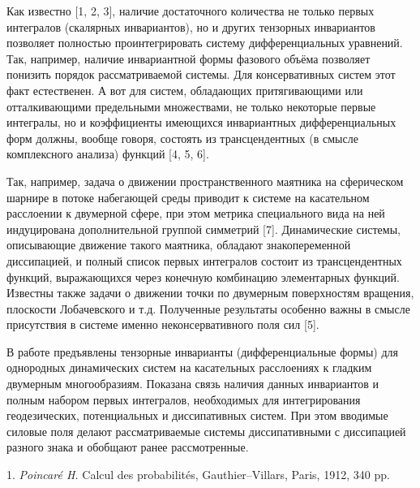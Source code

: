 
\vzmscaption



Как известно [1, 2, 3], наличие достаточного количества не только первых интегралов (скалярных инвариантов), но и других тензорных инвариантов позволяет полностью проинтегрировать систему дифференциальных уравнений. Так, например, наличие инвариантной формы фазового объёма позволяет понизить порядок рассматриваемой системы. Для консервативных систем этот факт естественен. А вот для систем, обладающих притягивающими или отталкивающими предельными множествами, не только некоторые первые интегралы, но и коэффициенты имеющихся инвариантных дифференциальных форм должны, вообще говоря, состоять из трансцендентных (в смысле комплексного анализа) функций [4, 5, 6].

Так, например, задача о движении пространственного маятника на сферическом шарнире в потоке набегающей среды приводит к системе на касательном расслоении к двумерной сфере, при этом метрика специального вида на ней индуцирована дополнительной группой симметрий [7]. Динамические системы, описывающие движение такого маятника, обладают знакопеременной диссипацией, и полный список первых интегралов состоит из трансцендентных функций, выражающихся через конечную комбинацию элементарных функций. Известны также задачи о движении точки по двумерным поверхностям вращения, плоскости Лобачевского и т.д. Полученные результаты особенно важны в смысле присутствия в системе именно неконсервативного поля сил [5].

В работе предъявлены тензорные инварианты (дифференциальные формы) для однородных динамических систем на касательных расслоениях к гладким двумерным многообразиям. Показана связь наличия данных инвариантов и полным набором первых интегралов, необходимых для интегрирования геодезических, потенциальных и диссипативных систем. При этом вводимые силовые поля делают рассматриваемые системы диссипативными с диссипацией разного знака и обобщают ранее рассмотренные.


\litlist

1. {\it Poincar\'{e} H.} Calcul des probabilit\'{e}s, Gauthier--Villars, Paris, 1912, 340 pp.

